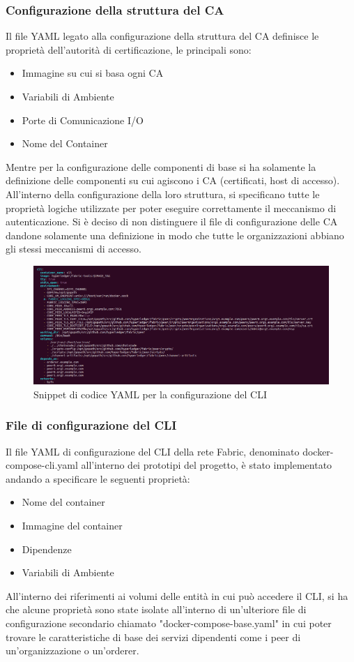 \subsubsection{Configurazione della struttura del CA}
Il file YAML legato alla configurazione della struttura del CA definisce le proprietà dell'autorità di certificazione, le principali sono: 
\begin{itemize}
    \item Immagine su cui si basa ogni CA
    \item Variabili di Ambiente
    \item Porte di Comunicazione I/O
    \item Nome del Container
\end{itemize}
Mentre per la configurazione delle componenti di base si ha solamente la definizione delle componenti su cui agiscono i CA (certificati, host di accesso). All'interno della configurazione della loro struttura, si specificano tutte le proprietà logiche utilizzate per poter eseguire correttamente il meccanismo di autenticazione. Si è deciso di non distinguere il file di configurazione delle CA dandone solamente una definizione in modo che tutte le organizzazioni abbiano gli stessi meccanismi di accesso. 
\begin{figure}[h]
    \centering
    \includegraphics[width=1\textwidth]{img/docker-compose-cli-yaml.png}
    \caption{Snippet di codice YAML per la configurazione del CLI}
    \label{fig:connection-cli-yaml}
\end{figure}
\subsubsection{File di configurazione del CLI}
Il file YAML di configurazione del CLI della rete Fabric, denominato docker-compose-cli.yaml all'interno dei prototipi del progetto, è stato implementato  andando a specificare le seguenti proprietà: 
\begin{itemize}
    \item Nome del container
    \item Immagine del container
    \item Dipendenze
    \item Variabili di Ambiente
\end{itemize}
All'interno dei riferimenti ai volumi delle entità in cui può accedere il CLI, si ha che alcune proprietà  sono state isolate all'interno di un'ulteriore file di configurazione secondario chiamato "docker-compose-base.yaml" in cui poter trovare le caratteristiche di base dei servizi dipendenti come i peer di un'organizzazione o un'orderer.
